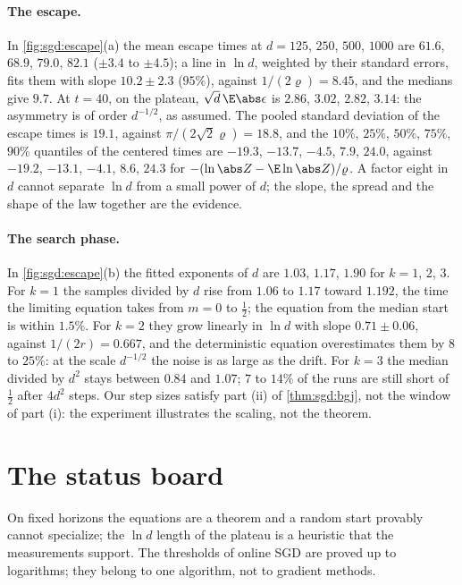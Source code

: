 \begin{refsection}
\paragraph{The escape.} In \cref{fig:sgd:escape}(a) the mean escape times at $d=125$, $250$, $500$, $1000$ are $61.6$, $68.9$, $79.0$, $82.1$ ($\pm3.4$ to $\pm4.5$); a line in $\ln d$, weighted by their standard errors, fits them with slope $10.2\pm2.3$ ($95\%$), against $1/(2\varrho)=8.45$, and the medians give $9.7$. At $t=40$, on the plateau, $\sqrt d\,\E\abs\epsilon$ is $2.86$, $3.02$, $2.82$, $3.14$: the asymmetry is of order $d^{-1/2}$, as assumed. The pooled standard deviation of the escape times is $19.1$, against $\pi/(2\sqrt2\varrho)=18.8$, and the $10\%$, $25\%$, $50\%$, $75\%$, $90\%$ quantiles of the centered times are $-19.3$, $-13.7$, $-4.5$, $7.9$, $24.0$, against $-19.2$, $-13.1$, $-4.1$, $8.6$, $24.3$ for $-(\ln\abs Z-\E\ln\abs Z)/\varrho$. A factor eight in $d$ cannot separate $\ln d$ from a small power of $d$; the slope, the spread and the shape of the law together are the evidence.

\paragraph{The search phase.} In \cref{fig:sgd:escape}(b) the fitted exponents of $d$ are $1.03$, $1.17$, $1.90$ for $k=1$, $2$, $3$. For $k=1$ the samples divided by $d$ rise from $1.06$ to $1.17$ toward $1.192$, the time the limiting equation takes from $m=0$ to $\frac12$; the equation from the median start is within $1.5\%$. For $k=2$ they grow linearly in $\ln d$ with slope $0.71\pm0.06$, against $1/(2r)=0.667$, and the deterministic equation overestimates them by $8$ to $25\%$: at the scale $d^{-1/2}$ the noise is as large as the drift. For $k=3$ the median divided by $d^2$ stays between $0.84$ and $1.07$; $7$ to $14\%$ of the runs are still short of $\frac12$ after $4d^2$ steps. Our step sizes satisfy part (ii) of \cref{thm:sgd:bgj}, not the window of part (i): the experiment illustrates the scaling, not the theorem.

\section{The status board}\label{sec:sgd:status}

On fixed horizons the equations are a theorem and a random start provably cannot specialize; the $\ln d$ length of the plateau is a heuristic that the measurements support. The thresholds of online SGD are proved up to logarithms; they belong to one algorithm, not to gradient methods.


\end{refsection}
